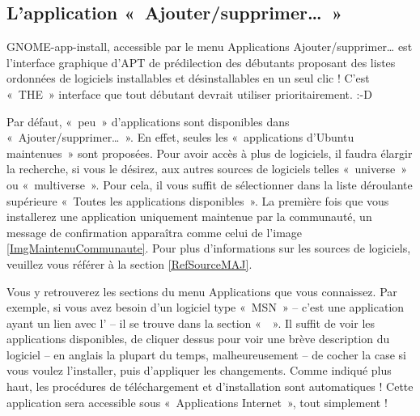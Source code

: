 {\subsection{L'application «~Ajouter/supprimer\dots{}~»}
\label{RefInstallAjouterSupprimer}
GNOME-app-install, accessible par le menu Applications \FlecheDroite Ajouter/supprimer\dots{} est l'interface graphique d'APT de prédilection des débutants proposant des listes ordonnées de logiciels installables et désinstallables en un seul clic ! C'est «~THE~» interface que tout débutant devrait utiliser prioritairement. :-D
\begin{nota}
Par défaut, «~peu~» d'applications sont disponibles dans «~Ajouter/supprimer\dots{}~». En effet, seules les «~applications d'Ubuntu maintenues~» sont proposées. Pour avoir accès à plus de logiciels, il faudra élargir la recherche, si vous le désirez, aux autres sources de logiciels telles «~universe~» ou «~multiverse~». Pour cela, il vous suffit de sélectionner dans la liste déroulante supérieure «~Toutes les applications disponibles~». La première fois que vous installerez une application uniquement maintenue par la communauté, un message de confirmation apparaîtra comme celui de l'image \ref{ImgMaintenuCommunaute}. Pour plus d'informations sur les sources de logiciels, veuillez vous référer à la section \ref{RefSourceMAJ}.
\end{nota}
Vous y retrouverez les sections du menu Applications que vous connaissez. Par exemple, si vous avez besoin d'un logiciel type «~MSN~» -- c'est une application ayant un lien avec l' -- il se trouve dans la section «~~». Il suffit de voir les applications disponibles, de cliquer dessus pour voir une brève description du logiciel -- en anglais la plupart du temps, malheureusement -- de cocher la case si vous voulez l'installer, puis d'appliquer les changements. Comme indiqué plus haut, les procédures de téléchargement et d'installation sont automatiques ! Cette application sera accessible sous «~Applications \FlecheDroite Internet~», tout simplement !\par
}
